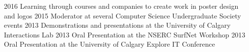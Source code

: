   \begin{cvskills} 
     	 \cvskill
      		{2016}
      		{Learning through courses and companies to create work in poster design and logos}
	 \cvskill
      		{2015}
      		{Moderator at several Computer Science Undergraduate Society events}
	 \cvskill
		{2013}
		{Demonstrations and presentations at the University of Calgary Interactions Lab}
	\cvskill
		{2013}
		{Oral Presentation at the NSERC SurfNet Workshop}
  	\cvskill
		{2013}
		{Oral Presentation at the University of Calgary Explore IT Conference}
  \end{cvskills}

